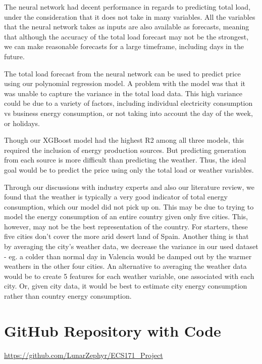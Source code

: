 \documentclass[10pt]{article}
\begin{document}
The neural network had decent performance in regards to predicting total load, under the consideration that it does not take in many variables. All the variables that the neural network takes as inputs are also available as forecasts, meaning that although the accuracy of the total load forecast may not be the strongest, we can make reasonable forecasts for a large timeframe, including days in the future.

The total load forecast from the neural network can be used to predict price using our polynomial regression model. A problem with the model was that it was unable to capture the variance in the total load data. This high variance could be due to a variety of factors, including individual electricity consumption vs business energy consumption, or not taking into account the day of the week, or holidays. 

Though our XGBoost model had the highest R2 among all three models, this required the inclusion of energy production sources. But predicting generation from each source is more difficult than predicting the weather. Thus, the ideal goal would be to predict the price using only the total load or weather variables. 

Through our discussions with industry experts and also our literature review, we found that the weather is typically a very good indicator of total energy consumption, which our model did not pick up on. This may be due to trying to model the energy consumption of an entire country given only five cities. This, however, may not be the best representation of the country. For starters, these five cities don’t cover the more arid desert land of Spain. Another thing is that by averaging the city’s weather data, we decrease the variance in our used dataset - eg. a colder than normal day in Valencia would be damped out by the warmer weathers in the other four cities. An alternative to averaging the weather data would be to create 5 features for each weather variable, one associated with each city. Or, given city data, it would be best to estimate city energy consumption rather than country energy consumption. 

\section{GitHub Repository with Code}

\url{https://github.com/LunarZephyr/ECS171_Project}
\end{document}
